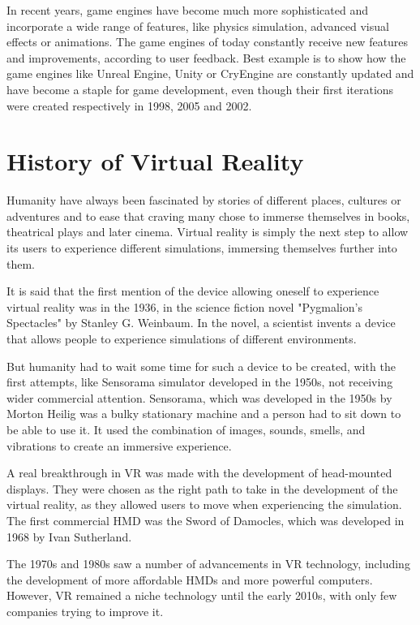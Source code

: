 In recent years, game engines have become much more sophisticated and incorporate a wide range of features, like physics simulation, advanced visual effects or animations. The game engines of today constantly receive new features and improvements, according to user feedback. Best example is to show how the game engines like Unreal Engine, Unity or CryEngine are constantly updated and have become a staple for game development, even though their first iterations were created respectively in 1998, 2005 and 2002.

\newpage
\section{History of Virtual Reality}
\label{sec:history_vr}
\hspace{\parindent}
Humanity have always been fascinated by stories of different places, cultures or adventures and to ease that craving many chose to immerse themselves in books, theatrical plays and later cinema. Virtual reality is simply the next step to allow its users to experience different simulations, immersing themselves further into them. 

It is said that the first mention of the device allowing oneself to experience virtual reality was in the 1936, in the science fiction novel "Pygmalion's Spectacles" by Stanley G. Weinbaum. In the novel, a scientist invents a device that allows people to experience simulations of different environments. 

But humanity had to wait some time for such a device to be created, with the first attempts, like Sensorama simulator developed in the 1950s, not receiving wider commercial attention. Sensorama, which was developed in the 1950s by Morton Heilig was a bulky stationary machine and a person had to sit down to be able to use it. It used the combination of images, sounds, smells, and vibrations to create an immersive experience.

A real breakthrough in VR was made with the development of head-mounted displays. They were chosen as the right path to take in the development of the virtual reality, as they allowed users to move when experiencing the simulation. The first commercial HMD was the Sword of Damocles, which was developed in 1968 by Ivan Sutherland.

The 1970s and 1980s saw a number of advancements in VR technology, including the development of more affordable HMDs and more powerful computers. However, VR remained a niche technology until the early 2010s, with only few companies trying to improve it.

